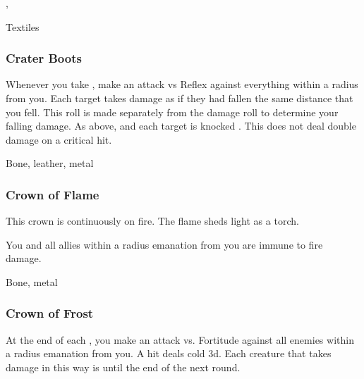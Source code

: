  , 


 Textiles


\lowercase{\hypertarget{item:Crater Boots}{}}\label{item:Crater Boots}
\hypertarget{item:Crater Boots}{\subsubsection{Crater Boots\hfill{}}}

Whenever you take , make an attack vs Reflex against everything within a \areasmall radius from you.
\hit Each target takes damage as if they had fallen the same distance that you fell.
This roll is made separately from the damage roll to determine your falling damage.
\crit As above, and each target is knocked .
This does not deal double damage on a critical hit.



 Bone, leather, metal


\lowercase{\hypertarget{item:Crown of Flame}{}}\label{item:Crown of Flame}
\hypertarget{item:Crown of Flame}{\subsubsection{Crown of Flame\hfill{}}}

This crown is continuously on fire.
The flame sheds light as a torch.

You and all allies within a \arealarge radius emanation from you are immune to fire damage.



 


 Bone, metal


\lowercase{\hypertarget{item:Crown of Frost}{}}\label{item:Crown of Frost}
\hypertarget{item:Crown of Frost}{\subsubsection{Crown of Frost\hfill{}}}

At the end of each , you make an attack vs. Fortitude against all enemies within a \areamed radius emanation from you.
A hit deals cold  \minus3d.
Each creature that takes damage in this way is \fatigued until the end of the next round.



